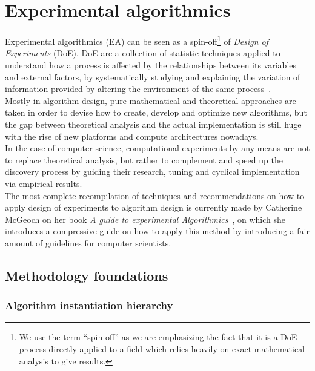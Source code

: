 \section{Experimental algorithmics}
\label{SECTION:EXPERIMENTAL_ALGORITHMICS}

Experimental algorithmics (EA) can be seen as a spin-off\footnote{We use the term ``spin-off'' as we are emphasizing the fact that it is a DoE process directly applied to a field which relies heavily on exact mathematical analysis to give results. } of \textit{Design of Experiments} (DoE). DoE are a collection of statistic techniques applied to understand how a process is affected by the relationships between its variables and external factors, by systematically studying and explaining the variation of information provided by altering the environment of the same process~\cite{Wagner_Mount_Giles_2014}.\\

Mostly in algorithm design, pure mathematical and theoretical approaches are taken in order to devise how to create, develop and optimize new algorithms, but the gap between theoretical analysis and the actual implementation is still huge with the rise of new platforms and compute architectures nowadays.\\

In the case of computer science, computational experiments by any means are not to replace theoretical analysis, but rather to complement and speed up the discovery process by guiding their research, tuning and cyclical implementation via empirical results.\\

The most complete recompilation of techniques and recommendations on how to apply design of experiments to algorithm design is currently made by Catherine McGeoch on her book \textit{A guide to experimental Algorithmics}~\cite{10.5555/2159557}, on which she introduces a compressive guide on how to apply this method by introducing a fair amount of guidelines for computer scientists.\\

\subsection{Methodology foundations}

\subsubsection{Algorithm instantiation hierarchy}

